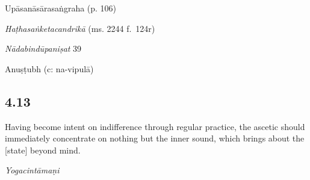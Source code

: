 \begin{ekdosis}
\begin{testimonia}[hp04_012]
Upāsanāsārasaṅgraha (p. 106)
\begin{versinnote}
\end{versinnote}

\emph{Haṭhasaṅketacandrikā} (ms. 2244 f.~124r)
\begin{versinnote}
\end{versinnote}

\emph{Nādabindūpaniṣat} 39
\begin{versinnote}
\end{versinnote}
\end{testimonia}


\begin{metre}[hp04_012]
Anuṣṭubh (c: na-vipulā)
\end{metre}

\subsection*{4.13}
\begin{translation}[hp04_013]
Having become intent on indifference through regular practice, the ascetic should immediately concentrate on nothing but the inner sound, which brings about the [state] beyond mind.%
\end{translation}


\begin{testimonia}[hp04_013]
\emph{Yogacintāmaṇi}
\begin{versinnote}
\end{versinnote}


\end{testimonia}
\end{ekdosis}
